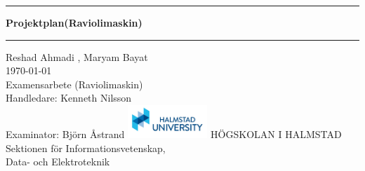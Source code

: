 \documentclass[11pt,a4paper,oneside]{book}
\begin{document}
\pagestyle{empty}

\frontmatter

\begin{titlepage}
  \begin{center}
  \end{center}
  \vspace{3cm}
  \begin{center}
    \hrule \vspace{0.5cm}
    {\Huge \bfseries \sffamily \color{hhblue} Projektplan(Raviolimaskin)}\\
    \vspace{0.8cm} \hrule \vspace{2cm} {\Large{Reshad Ahmadi , Maryam Bayat}}\\
    \vspace{2cm}
    \today\\
    \vspace{3cm}
    Examensarbete (Raviolimaskin)\\
    \vspace{1.5cm}
    Handledare: Kenneth Nilsson\\
    \vspace{0.5cm} Examinator: Björn Åstrand \vfill
    \includegraphics[width=3cm]{images/hh_logo.jpg}
    HÖGSKOLAN I HALMSTAD\\
    Sektionen för Informationsvetenskap, \\
    Data- och Elektroteknik
  \end{center}
\end{titlepage}


\end{document}
